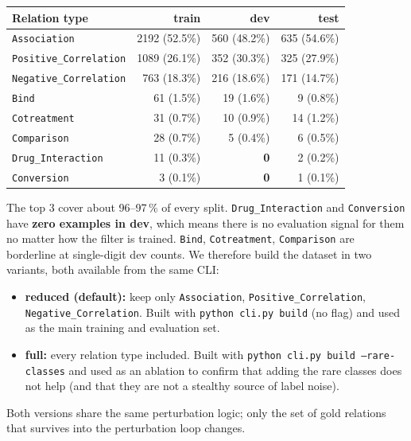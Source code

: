 \documentclass[11pt,a4paper]{article}
\newcommand{\code}[1]{\texttt{#1}}
\begin{document}
\begin{center}
\begin{tabular}{@{}l r r r@{}}
\toprule
\textbf{Relation type} & \textbf{train} & \textbf{dev} & \textbf{test} \\
\midrule
\code{Association}          & 2192 (52.5\%) & 560 (48.2\%) & 635 (54.6\%) \\
\code{Positive\_Correlation} & 1089 (26.1\%) & 352 (30.3\%) & 325 (27.9\%) \\
\code{Negative\_Correlation} &  763 (18.3\%) & 216 (18.6\%) & 171 (14.7\%) \\
\code{Bind}                 &   61 (1.5\%)  &  19 (1.6\%)  &   9 (0.8\%)  \\
\code{Cotreatment}          &   31 (0.7\%)  &  10 (0.9\%)  &  14 (1.2\%)  \\
\code{Comparison}           &   28 (0.7\%)  &   5 (0.4\%)  &   6 (0.5\%)  \\
\code{Drug\_Interaction}    &   11 (0.3\%)  & \textbf{0}   &   2 (0.2\%)  \\
\code{Conversion}           &    3 (0.1\%)  & \textbf{0}   &   1 (0.1\%)  \\
\bottomrule
\end{tabular}
\end{center}

\noindent
The top 3 cover about 96--97\,\% of every split. \code{Drug\_Interaction} and \code{Conversion} have \textbf{zero examples in dev}, which means there is no evaluation signal for them no matter how the filter is trained. \code{Bind}, \code{Cotreatment}, \code{Comparison} are borderline at single-digit dev counts. We therefore build the dataset in two variants, both available from the same CLI:

\begin{itemize}
\item \textbf{reduced (default):} keep only \code{Association}, \code{Positive\_Correlation}, \code{Negative\_Correlation}. Built with \code{python cli.py build} (no flag) and used as the main training and evaluation set.
\item \textbf{full:} every relation type included. Built with \code{python cli.py build --rare-classes} and used as an ablation to confirm that adding the rare classes does not help (and that they are not a stealthy source of label noise).
\end{itemize}

\noindent
Both versions share the same perturbation logic; only the set of gold relations that survives into the perturbation loop changes.
\end{document}

